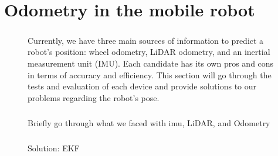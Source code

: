 \chapter{Odometry in the mobile robot}

\begin{figure} [H]

\paragraph*{}
Currently, we have three main sources of information to predict a robot's position: wheel odometry, LiDAR odometry, and an inertial measurement unit (IMU). Each candidate has its own pros and cons in terms of accuracy and efficiency. This section will go through the tests and evaluation of each device and provide solutions to our problems regarding the robot's pose.

\paragraph*{}
Briefly go through what we faced with imu, LiDAR, and Odometry

\paragraph*{}
Solution: EKF

\end{figure}
